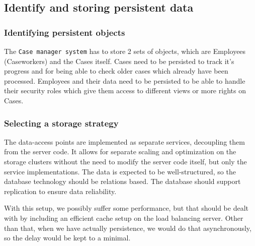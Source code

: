 \subsection{Identify and storing persistent data}

\subsubsection{Identifying persistent objects}
The \texttt{Case manager system} has to store 2 sets of objects, which are Employees (Caseworkers) and the Cases itself.
Cases need to be persisted to track it's progress and for being able to check older cases which already have been processed.
Employees and their data need to be persisted to be able to handle their security roles which give them access to different views or more rights on Cases.

\subsubsection{Selecting a storage strategy}
The data-access points are implemented as separate services, decoupling them from the server code. It allows for separate scaling and optimization on the storage clusters without the need to modify the server code itself, but only the service implementations. The data is expected to be well-structured, so the database technology should be relations based. The database should support replication to ensure data reliability.

\vspace{2mm}

With this setup, we possibly suffer some performance, but that should be dealt with by including an efficient cache setup on the load balancing server. Other than that, when we have actually persistence, we would do that asynchronously, so the delay would be kept to a minimal.
